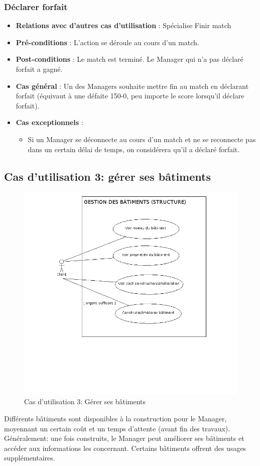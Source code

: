 \documentclass[a4paper,titlepage]{scrreprt}
\begin{document}
    \subsubsection{Déclarer forfait}
      \begin{itemize}
        \item \textbf{Relations avec d'autres cas d'utilisation}  : Spécialise Finir match
        \item \textbf{Pré-conditions} : L'action se déroule au cours d'un match.
        \item \textbf{Post-conditions} : Le match est terminé. Le Manager qui n'a pas déclaré forfait a gagné.
        \item \textbf{Cas général} : Un des Managers souhaite mettre fin au match en déclarant forfait (équivaut à une défaite 150-0, peu importe le score lorsqu’il déclare forfait).
        \item \textbf{Cas exceptionnels} :
          \begin{itemize}
            \item Si un Manager se déconnecte au cours d’un match et ne se reconnecte pas dans un certain délai de temps, on considérera qu’il a déclaré forfait.
          \end{itemize}
      \end{itemize}


  \subsection{Cas d'utilisation 3: gérer ses bâtiments}
    \begin{figure}[H]
    \center
    \includegraphics[scale=0.5]{uml/useCaseView/Gestiondesbatimentsstructure.png}
    \caption{Cas d'utilisation 3: Gérer ses bâtiments}
  \end{figure}	
  Différents bâtiments sont disponibles à la construction pour le Manager, 
  moyennant un certain coût et un temps d'attente (avant fin des travaux). 
  Généralement: une fois construits, le Manager peut améliorer ses bâtiments 
  et accéder aux informations les concernant. Certains bâtiments offrent 
  des usages supplémentaires.
\end{document}
